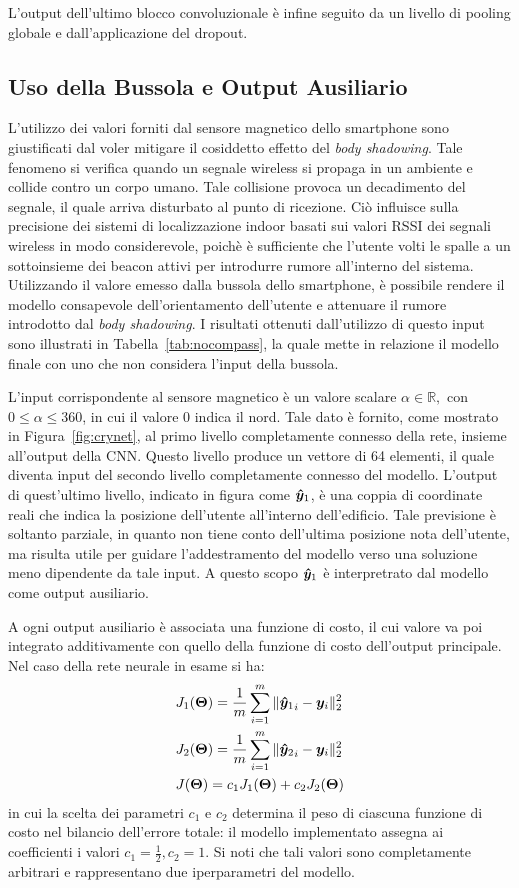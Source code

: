 L'output dell'ultimo blocco convoluzionale è infine seguito da un livello di
pooling globale e dall'applicazione del dropout.
\subsection{Uso della Bussola e Output Ausiliario}
L'utilizzo dei valori forniti dal sensore magnetico dello smartphone sono
giustificati dal voler mitigare il cosiddetto effetto del \emph{body
  shadowing}.  Tale fenomeno si verifica quando un segnale wireless si propaga
in un ambiente e collide contro un corpo umano. Tale collisione provoca un
decadimento del segnale, il quale arriva disturbato al punto di ricezione. Ciò
influisce sulla precisione dei sistemi di localizzazione indoor basati sui
valori RSSI dei segnali wireless in modo considerevole, poichè è sufficiente che
l'utente volti le spalle a un sottoinsieme dei beacon attivi per introdurre
rumore all'interno del sistema. Utilizzando il valore emesso dalla bussola
dello smartphone, è possibile rendere il modello consapevole dell'orientamento
dell'utente e attenuare il rumore introdotto dal \emph{body shadowing}. I
risultati ottenuti dall'utilizzo di questo input sono illustrati in
Tabella~\ref{tab:nocompass}, la quale mette in relazione il modello finale con
uno che non considera l'input della bussola.


L'input corrispondente al sensore magnetico è un valore scalare \(\alpha \in
  \mathbb{R}, \) con \(0 \leq \alpha \leq 360\), in cui il valore \(0\) indica
il nord. Tale dato è fornito, come mostrato in Figura~\ref{fig:crynet}, al
primo livello completamente connesso della rete, insieme all'output della
CNN\@.  Questo livello produce un vettore di 64 elementi, il quale diventa
input del secondo livello completamente connesso del modello. L'output di
quest'ultimo livello, indicato in figura come \(\bm\hat{\bm y}_1\), è una coppia
di coordinate reali che indica la posizione dell'utente all'interno
dell'edificio.  Tale previsione è soltanto parziale, in quanto non tiene conto
dell'ultima posizione nota dell'utente, ma risulta utile per guidare
l'addestramento del modello verso una soluzione meno dipendente da tale input.
A questo scopo \(\bm\hat{\bm y}_1\) è interpretrato dal modello come output
ausiliario.

A ogni output ausiliario è associata una funzione di costo, il cui valore va
poi integrato additivamente con quello della funzione di costo dell'output
principale. Nel caso della rete neurale in esame si ha:
\begin{align*}
  &J_1(\bm \Theta) =  \frac{1}{m} \sum_{i=1}^m{\| {{}\bm\hat{\bm y}_1}_{i} - \bm y_i\|^2_2} \\
  &J_2(\bm \Theta) =  \frac{1}{m} \sum_{i=1}^m{\| {{}\bm\hat{\bm y}_2}_{i} - \bm y_i\|^2_2} \\
  &J(\bm \Theta) = c_1 J_1(\bm \Theta) + c_2 J_2(\bm \Theta)
\end{align*}
in cui la scelta dei parametri \(c_1\) e \(c_2\) determina il peso di ciascuna
funzione di costo nel bilancio dell'errore totale: il modello implementato
assegna ai coefficienti i valori \( c_1 = \frac{1}{2}, c_2 = 1 \). Si noti che
tali valori sono completamente arbitrari e rappresentano due iperparametri del
modello.


